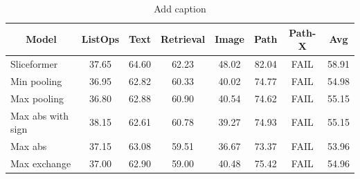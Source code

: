 \begin{table}[htbp]
  \centering
  \caption{Add caption}
    \begin{tabular}{l|cccccc|c}
    \toprule
    \multicolumn{1}{c|}{Model} & ListOps & Text  & Retrieval & Image & Path  & Path-X & Avg \\
    \midrule
    Sliceformer & 37.65 & 64.60  & 62.23 & 48.02 & 82.04 & FAIL  & 58.91 \\
    Min pooling & 36.95 & 62.82 & 60.33 & 40.02 & 74.77 & FAIL  & 54.98 \\
    Max pooling & 36.80 & 62.88 & 60.90 & 40.54 & 74.62 & FAIL  & 55.15 \\
    Max abs with sign & 38.15 & 62.61 & 60.78 & 39.27 & 74.93 & FAIL  & 55.15 \\
    Max abs & 37.15 & 63.08 & 59.51 & 36.67 & 73.37 & FAIL  & 53.96 \\
    Max exchange & 37.00 & 62.90 & 59.00 & 40.48 & 75.42 & FAIL  & 54.96 \\
    \bottomrule
    \end{tabular}%
  \label{tab:addlabel}%
\end{table}%



